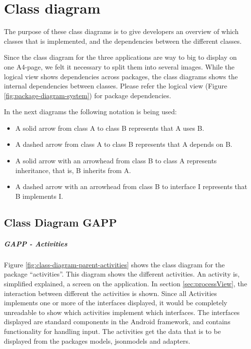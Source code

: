 \chapter{Class diagram}
\label{chap:class-diagram}

The purpose of these class diagrams is to give developers an overview of
which classes that is implemented, and the dependencies between the different classes. 

Since the class diagram for the three applications are way to big to display on one A4-page, we felt it 
necessary to split them into several images. 
While the logical view shows dependencies across packages, the class diagrams shows the internal dependencies between
classes. 
Please refer the logical view (Figure \ref{fig:package-diagram-system}) for package dependencies.     


In the next diagrams the following notation is being used:
\begin{itemize}
	\item A solid arrow from class A to class B represents that A uses B.
	\item A dashed arrow from class A to class B represents that A depends on B.
	\item A solid arrow with an arrowhead from class B to class A represents inheritance, that is, B inherits from A.
	\item A dashed arrow with an arrowhead from class B to interface I represents that B implements I.
\end{itemize}

\section{Class Diagram GAPP}
\label{sec:class-diagram-capp}

\paragraph{GAPP - Activities}
Figure \ref{fig:class-diagram-parent-activities} shows the class diagram for the package ``activities''.
This diagram shows the different activities. An activity is, simplified explained, a screen on the application. In section \ref{sec:processView}, the interaction
between different the activities is shown. Since all Activities implements one or more of the interfaces displayed, it
would be completely unreadable to show which activities implement which interfaces. 
The interfaces displayed are standard components in the Android framework, and contains functionality for handling
input. 
The activities get the data that is to be displayed from the packages models, jsonmodels and adapters.    

